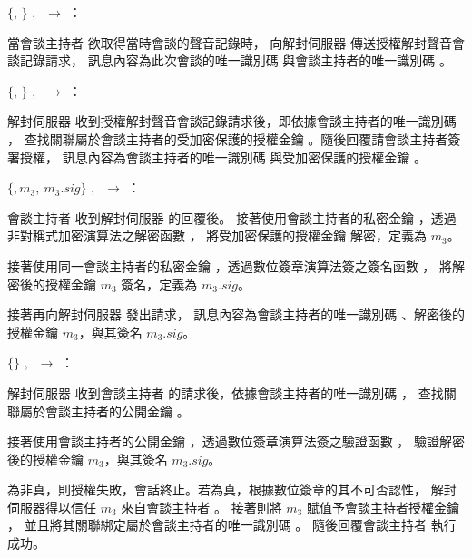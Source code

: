 \begin{pmsgsi}
    \item $\{$\DEFsessionID, \DEFownerID$\}$ $,~$  \DEFowner $\rightarrow$ \DEFserver：

        當會談主持者 \DEFowner 欲取得當時會談的聲音記錄時，
    向解封伺服器 \DEFserver 傳送授權解封聲音會談記錄請求，
    訊息內容為此次會談的唯一識別碼 \DEFsessionID 與會談主持者的唯一識別碼 \DEFownerID。

    \item $\{$\DEFownerID, \DEFakEnc$\}$ $,~$  \DEFserver $\rightarrow$ \DEFowner：

        解封伺服器 \DEFserver 收到授權解封聲音會談記錄請求後，即依據會談主持者的唯一識別碼 \DEFownerID，
    查找關聯屬於會談主持者的受加密保護的授權金鑰 \DEFakEnc。隨後回覆請會談主持者簽署授權，
    訊息內容為會談主持者的唯一識別碼 \DEFownerID 與受加密保護的授權金鑰 \DEFakEnc。

    \item $\{$\DEFownerID$, m_{3}, ~m_{3}.sig\}$ $,~$  \DEFowner $\rightarrow$ \DEFserver：

        會談主持者 \DEFowner 收到解封伺服器 \DEFserver 的回覆後。
    接著使用會談主持者的私密金鑰 \DEFprivateKey，透過非對稱式加密演算法之解密函數 \DEFfuncDecSK{}，
    將受加密保護的授權金鑰 \DEFakEnc 解密，定義為 $m_{3}$。

        接著使用同一會談主持者的私密金鑰 \DEFprivateKey，透過數位簽章演算法簽之簽名函數 \DEFfuncSignSK{}，
    將解密後的授權金鑰 $m_{3}$ 簽名，定義為 $m_{3}.sig$。

        接著再向解封伺服器 \DEFserver 發出請求，
    訊息內容為會談主持者的唯一識別碼 \DEFownerID、解密後的授權金鑰 $m_{3}$，與其簽名 $m_{3}.sig$。


    \item $\{\}$ $,~$ \DEFserver $\rightarrow$ \DEFowner：

        解封伺服器 \DEFserver 收到會談主持者 \DEFowner 的請求後，依據會談主持者的唯一識別碼 \DEFownerID，
    查找關聯屬於會談主持者的公開金鑰 \DEFpublicKey。

        接著使用會談主持者的公開金鑰 \DEFpublicKey，透過數位簽章演算法簽之驗證函數 \DEFfuncVerfPK{}，
    驗證解密後的授權金鑰 $m_{3}$，與其簽名 $m_{3}.sig$。

        為非真，則授權失敗，會話終止。若為真，根據數位簽章的其不可否認性，
    解封伺服器得以信任 $m_{3}$ 來自會談主持者 \DEFowner。
    接著則將 $m_{3}$ 賦值予會談主持者授權金鑰 \DEFagentKey，
    並且將其關聯綁定屬於會談主持者的唯一識別碼 \DEFownerID。
    隨後回覆會談主持者 \DEFowner 執行成功。
\end{pmsgsi}


